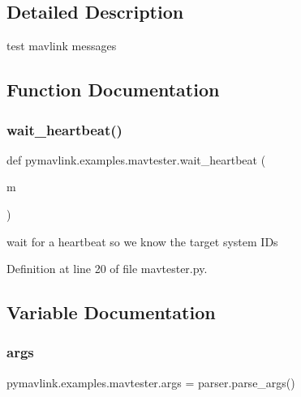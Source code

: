 \subsection{Detailed Description}
\begin{DoxyVerb}test mavlink messages
\end{DoxyVerb}
 

\subsection{Function Documentation}
\mbox{\label{namespacepymavlink_1_1examples_1_1mavtester_ae1bf609bf03b42c2ed744e90dbb30db3}} 
\subsubsection{\texorpdfstring{wait\_heartbeat()}{wait\_heartbeat()}}
{\footnotesize\ttfamily def pymavlink.\+examples.\+mavtester.\+wait\+\_\+heartbeat (\begin{DoxyParamCaption}\item[{}]{m }\end{DoxyParamCaption})}

\begin{DoxyVerb}wait for a heartbeat so we know the target system IDs\end{DoxyVerb}
 

Definition at line 20 of file mavtester.\+py.



\subsection{Variable Documentation}
\mbox{\label{namespacepymavlink_1_1examples_1_1mavtester_aaac9e510d5e48381c651f2742fa7cf15}} 
\subsubsection{\texorpdfstring{args}{args}}
{\footnotesize\ttfamily pymavlink.\+examples.\+mavtester.\+args = parser.\+parse\+\_\+args()}




